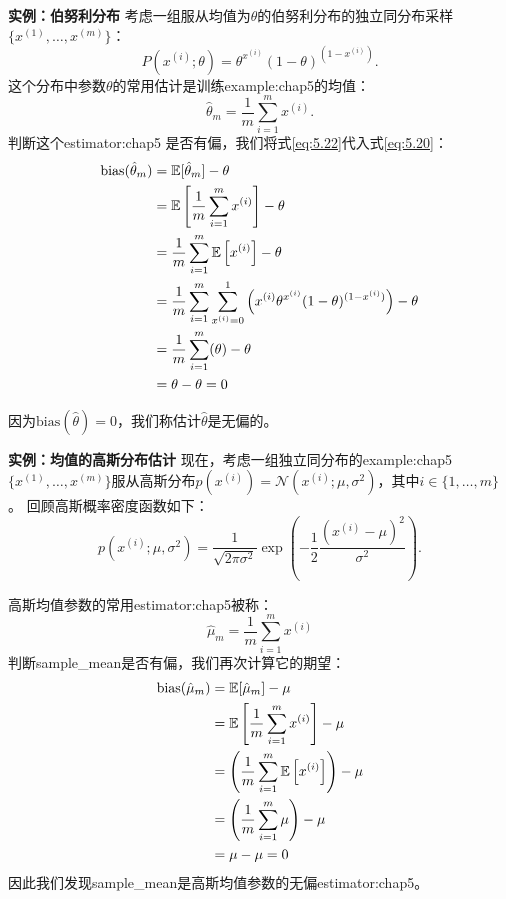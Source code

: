 \textbf{实例：伯努利分布}\quad 
考虑一组服从均值为$\theta$的伯努利分布的独立同分布采样$\{x^{(1)}, \dots , x^{(m)}\}$：
\begin{equation}
    P(x^{(i)}; \theta) = \theta^{x^{(i)}} (1-\theta)^{(1 - x^{(i)})}.
\end{equation}
这个分布中参数$\theta$的常用估计是训练\gls{example:chap5}的均值：
\begin{equation}
\label{eq:5.22}
    \hat{\theta}_m = \frac{1}{m} \sum_{i=1}^m x^{(i)}.
\end{equation}
判断这个\gls{estimator:chap5} 是否有偏，我们将式\ref{eq:5.22}代入式\ref{eq:5.20}：
\begin{align}
    \text{bias}(\hat{\theta}_m)     &= \mathbb{E}[\hat{\theta}_m] - \theta  \\
            &= \mathbb{E} \left[ \frac{1}{m} \sum_{i=1}^m x^{(i)} \right] - \theta \\
            &= \frac{1}{m} \sum_{i=1}^m \mathbb{E} \left[x^{(i)} \right] - \theta \\
            &= \frac{1}{m} \sum_{i=1}^m \sum_{x^{(i)} = 0}^1 \left( x^{(i)} \theta^{x^{(i)}} (1-\theta)^{(1-x^{(i)})} \right) - \theta \\
            &= \frac{1}{m} \sum_{i=1}^m (\theta) - \theta \\
            &= \theta - \theta = 0
\end{align}

因为$\text{bias}(\hat{\theta})=0$，我们称估计$\hat{\theta}$是无偏的。

\textbf{实例：均值的高斯分布估计}\quad 
现在，考虑一组独立同分布的\gls{example:chap5}$\{x^{(1)}, \dots , x^{(m)}\}$服从高斯分布$p(x^{(i)}) = \mathcal{N}(x^{(i)}; \mu, \sigma^2)$，其中$i\in\{1, \dots, m\}$。
回顾高斯概率密度函数如下：
\begin{equation}
    p(x^{(i)}; \mu, \sigma^2) = \frac{1}{\sqrt{2\pi\sigma^2}} \exp\left( -\frac{1}{2} \frac{(x^{(i)} - \mu)^2}{\sigma^2}  \right).
\end{equation}

高斯均值参数的常用\gls{estimator:chap5}被称：
\begin{equation}
    \hat{\mu}_m = \frac{1}{m} \sum_{i=1}^m x^{(i)}
\end{equation}
判断\gls{sample_mean}是否有偏，我们再次计算它的期望：
\begin{align}
\text{bias} (\hat{\mu}_m) &= \mathbb{E}[ \hat{\mu}_m ]  - \mu \\
    &= \mathbb{E} \left[ \frac{1}{m} \sum_{i=1}^m x^{(i)}  \right] - \mu \\
    &= \left( \frac{1}{m}\sum_{i=1}^m \mathbb{E} \left[ x^{(i)} \right] \right) - \mu \\
    &= \left( \frac{1}{m}\sum_{i=1}^m \mu \right) - \mu \\
    &= \mu - \mu = 0
\end{align}
因此我们发现\gls{sample_mean}是高斯均值参数的无偏\gls{estimator:chap5}。

